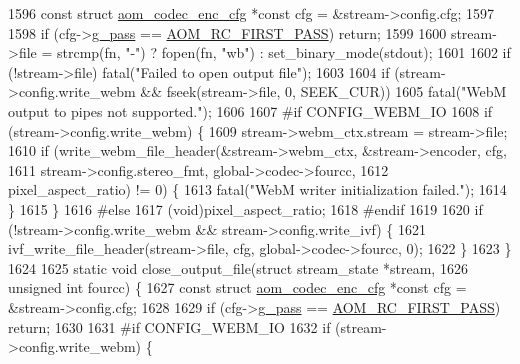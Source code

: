 \begin{DoxyCodeInclude}
{{{{{{{{{{{{{{{{{{{{{{{{{{{{{{1596   \textcolor{keyword}{const} \textcolor{keyword}{struct }\hyperlink{structaom__codec__enc__cfg}{aom\_codec\_enc\_cfg} *\textcolor{keyword}{const} cfg = &stream->config.cfg;
1597 
1598   \textcolor{keywordflow}{if} (cfg->\hyperlink{structaom__codec__enc__cfg_aad58e4d10c7904d50ce959aef202dc64}{g\_pass} == \hyperlink{group__encoder_gga92b6709b58dc3435e3ba652da562eda1ad342b33a290482c20238bfde5d9bea1e}{AOM\_RC\_FIRST\_PASS}) \textcolor{keywordflow}{return};
1599 
1600   stream->file = strcmp(fn, \textcolor{stringliteral}{"-"}) ? fopen(fn, \textcolor{stringliteral}{"wb"}) : set\_binary\_mode(stdout);
1601 
1602   \textcolor{keywordflow}{if} (!stream->file) fatal(\textcolor{stringliteral}{"Failed to open output file"});
1603 
1604   \textcolor{keywordflow}{if} (stream->config.write\_webm && fseek(stream->file, 0, SEEK\_CUR))
1605     fatal(\textcolor{stringliteral}{"WebM output to pipes not supported."});
1606 
1607 \textcolor{preprocessor}{#if CONFIG\_WEBM\_IO}
1608   \textcolor{keywordflow}{if} (stream->config.write\_webm) \{
1609     stream->webm\_ctx.stream = stream->file;
1610     \textcolor{keywordflow}{if} (write\_webm\_file\_header(&stream->webm\_ctx, &stream->encoder, cfg,
1611                                stream->config.stereo\_fmt, global->codec->fourcc,
1612                                pixel\_aspect\_ratio) != 0) \{
1613       fatal(\textcolor{stringliteral}{"WebM writer initialization failed."});
1614     \}
1615   \}
1616 \textcolor{preprocessor}{#else}
1617   (void)pixel\_aspect\_ratio;
1618 \textcolor{preprocessor}{#endif}
1619 
1620   \textcolor{keywordflow}{if} (!stream->config.write\_webm && stream->config.write\_ivf) \{
1621     ivf\_write\_file\_header(stream->file, cfg, global->codec->fourcc, 0);
1622   \}
1623 \}
1624 
1625 \textcolor{keyword}{static} \textcolor{keywordtype}{void} close\_output\_file(\textcolor{keyword}{struct} stream\_state *stream,
1626                               \textcolor{keywordtype}{unsigned} \textcolor{keywordtype}{int} fourcc) \{
1627   \textcolor{keyword}{const} \textcolor{keyword}{struct }\hyperlink{structaom__codec__enc__cfg}{aom\_codec\_enc\_cfg} *\textcolor{keyword}{const} cfg = &stream->config.cfg;
1628 
1629   \textcolor{keywordflow}{if} (cfg->\hyperlink{structaom__codec__enc__cfg_aad58e4d10c7904d50ce959aef202dc64}{g\_pass} == \hyperlink{group__encoder_gga92b6709b58dc3435e3ba652da562eda1ad342b33a290482c20238bfde5d9bea1e}{AOM\_RC\_FIRST\_PASS}) \textcolor{keywordflow}{return};
1630 
1631 \textcolor{preprocessor}{#if CONFIG\_WEBM\_IO}
1632   \textcolor{keywordflow}{if} (stream->config.write\_webm) \{
}}}}}}}}}}}}}}}}}}}}}}}}}}}}}}
\end{DoxyCodeInclude}
